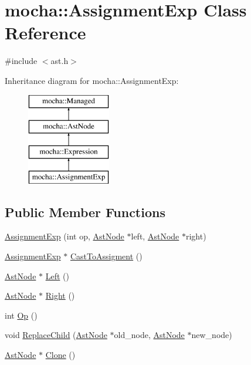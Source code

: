 \hypertarget{classmocha_1_1_assignment_exp}{
\section{mocha::AssignmentExp Class Reference}
\label{classmocha_1_1_assignment_exp}
}


{\ttfamily \#include $<$ast.h$>$}

Inheritance diagram for mocha::AssignmentExp:\begin{figure}[H]
\begin{center}
\leavevmode
\includegraphics[height=4.000000cm]{classmocha_1_1_assignment_exp}
\end{center}
\end{figure}
\subsection*{Public Member Functions}
\begin{DoxyCompactItemize}
\item 
\hyperlink{classmocha_1_1_assignment_exp_a467744dd3da0f4e4589fd17eea275122}{AssignmentExp} (int op, \hyperlink{classmocha_1_1_ast_node}{AstNode} $\ast$left, \hyperlink{classmocha_1_1_ast_node}{AstNode} $\ast$right)
\item 
\hyperlink{classmocha_1_1_assignment_exp}{AssignmentExp} $\ast$ \hyperlink{classmocha_1_1_assignment_exp_ae8016bd58008fae4ae8e009f403fc9b0}{CastToAssigment} ()
\item 
\hyperlink{classmocha_1_1_ast_node}{AstNode} $\ast$ \hyperlink{classmocha_1_1_assignment_exp_a68245835b583847ee2aad68142d72cae}{Left} ()
\item 
\hyperlink{classmocha_1_1_ast_node}{AstNode} $\ast$ \hyperlink{classmocha_1_1_assignment_exp_acae30f2d8b41b29a90de4f2e2b425407}{Right} ()
\item 
int \hyperlink{classmocha_1_1_assignment_exp_a847a00375a65b134a03d96bbafd1c0f6}{Op} ()
\item 
void \hyperlink{classmocha_1_1_assignment_exp_a11115bd08d4ea4fc93a19bcc1fdf306d}{ReplaceChild} (\hyperlink{classmocha_1_1_ast_node}{AstNode} $\ast$old\_\-node, \hyperlink{classmocha_1_1_ast_node}{AstNode} $\ast$new\_\-node)
\item 
\hyperlink{classmocha_1_1_ast_node}{AstNode} $\ast$ \hyperlink{classmocha_1_1_assignment_exp_ac266c79bc33aaba7a6de7bb34a966786}{Clone} ()
\end{DoxyCompactItemize}
